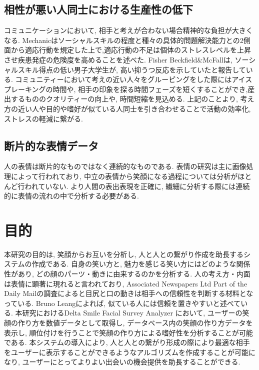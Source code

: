 
\subsection{相性が悪い人同士における生産性の低下}
コミュニケーションにおいて, 相手と考えが合わない場合精神的な負担が大きくなる.
Mechanicはソーシャルスキルの程度と種々の具体的問題解決能力との2側面から適応行動を規定した上で,適応行動の不足は個体のストレスレベルを上昇させ疾患発症の危険度を高めることを述べた.\cite{Mechanic}
Fisher Beckfield\&McFallは, ソーシャルスキル得点の低い男子大学生が, 高い抑うつ反応を示していたと報告している.\cite{FisherMcFall}
コミュニティーにおいて考えの近い人々をグルーピングをした際にはアイスプレーキングの時間や, 相手の印象を探る時間フェーズを短くすることができ,産出するもののクオリティーの向上や, 時間短縮を見込める.
上記のことより, 考え方の近い人や目的や嗜好が似ている人同士を引き合わせることで活動の効率化, ストレスの軽減に繋がる.


\subsection{断片的な表情データ}
人の表情は断片的なものではなく連続的なものである. 表情の研究は主に画像処理によって行われており, 中立の表情から笑顔になる過程については分析がほとんど行われていない.
より人間の表出表現を正確に, 繊細に分析する際には連続的に表情の流れの中で分析する必要がある.

\section{目的}
本研究の目的は, 笑顔からお互いを分析し, 人と人との繋がり作成を助長するシステムの作成である.
自身の笑い方と, 魅力を感じる笑い方にはどのような関係性があり, どの顔のパーツ・動きに由来するのかを分析する.
人の考え方・内面は表情に顕著に現れると言われており, Associated Newspapers Ltd Part of the Daily Mailの調査によると目尻と口の動きは相手への信頼性を判断する材料となっている.\cite{TheMailonSunday} Bruno Leangによれば, 似ている人には信頼を置きやすいと述べている.\cite{Bruno}
本研究におけるDelta Smile Facial Survey Analyzer において, ユーザーの笑顔の作り方を数値データとして取得し,
データベース内の笑顔の作り方データを表示し, 順位付けを行うことで笑顔の作り方による嗜好性を分析することが可能である.
本システムの導入により, 人と人との繋がり形成の際により最適な相手をユーザーに表示することができるようなアルゴリズムを作成することが可能になり,
ユーザーにとってよりよい出会いの機会提供を助長することができる.

